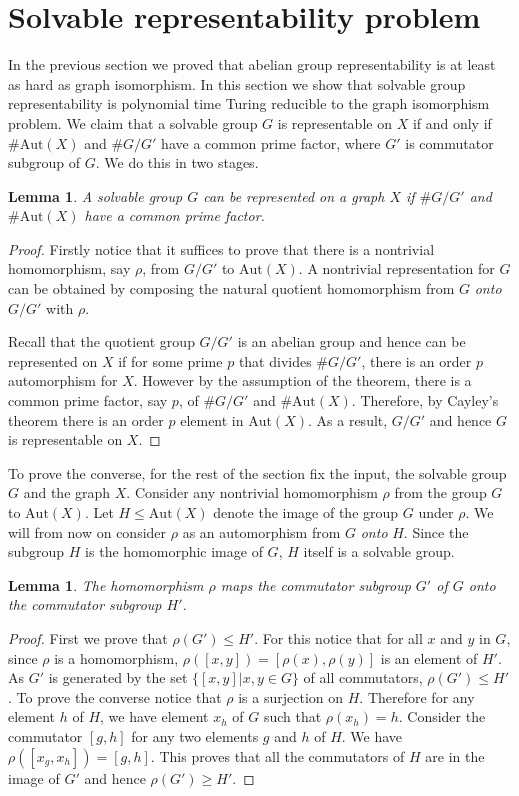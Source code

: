 \documentclass[a4paper,11pt]{article}
\newtheorem{lemma}[theorem]{Lemma}
\newcommand{\Aut}[1]{\ensuremath{\mathrm{Aut}\left(#1\right)}}
\begin{document}
\section{Solvable representability problem}

In the previous section we proved that abelian group representability
is at least as hard as graph isomorphism. In this section we show that
solvable group representability is polynomial time Turing reducible to
the graph isomorphism problem. We claim that a solvable group $G$ is
representable on $X$ if and only if $\# \Aut{X}$ and $\# G/G'$ have a
common prime factor, where $G'$ is commutator subgroup of $G$. We do
this in two stages.

\begin{lemma}\label{lem-solf}
  A solvable group $G$ can be represented on a graph $X$ if $\#G/G'$
  and $\#\Aut{X}$ have a common prime factor.
\end{lemma}
\begin{proof}

Firstly notice that it suffices to prove that there is a nontrivial
homomorphism, say $\rho$, from $G/G'$ to $\Aut{X}$. A nontrivial
representation for $G$ can be obtained by composing the natural
quotient homomorphism from $G$ \emph{onto} $G/G'$ with $\rho$.

Recall that the quotient group $G/G'$ is an abelian group and hence
can be represented on $X$ if for some prime $p$ that divides $\#
G/G'$, there is an order $p$ automorphism for $X$. However by the
assumption of the theorem, there is a common prime factor, say $p$, of
$\# G/G'$ and $\# \Aut{X}$. Therefore, by Cayley's theorem there is an
order $p$ element in $\Aut{X}$. As a result, $G/G'$ and hence $G$ is
representable on $X$.
\end{proof}

To prove the converse, for the rest of the section fix the input, the
solvable group $G$ and the graph $X$. Consider any nontrivial
homomorphism $\rho$ from the group $G$ to $\Aut{X}$. Let $H \leq
\Aut{X}$ denote the image of the group $G$ under $\rho$. We will from
now on consider $\rho$ as an automorphism from $G$ \emph{onto}
$H$. Since the subgroup $H$ is the homomorphic image of $G$, $H$
itself is a solvable group.

\begin{lemma}\label{comm}
The homomorphism $\rho$ maps the commutator subgroup $G'$ of $G$
\emph{onto} the commutator subgroup $H'$.
\end{lemma}
\begin{proof}
  First we prove that $\rho(G') \leq H'$. For this notice that for all
  $x$ and $y$ in $G$, since $\rho$ is a homomorphism, $\rho([x,y]) =
  [\rho(x),\rho(y)]$ is an element of $H'$. As $G'$ is generated by
  the set $\{ [x,y] | x,y \in G\}$ of all commutators, $\rho(G') \leq
  H'$.  To prove the converse notice that $\rho$ is a surjection on
  $H$.  Therefore for any element $h$ of $H$, we have element $x_h$ of
  $G$ such that $\rho(x_h) = h$. Consider the commutator $[g,h]$ for
  any two elements $g$ and $h$ of $H$. We have $\rho([x_g,x_h]) =
  [g,h]$.  This proves that all the commutators of $H$ are in the
  image of $G'$ and hence $\rho(G') \geq H'$.
\end{proof}
\end{document}
